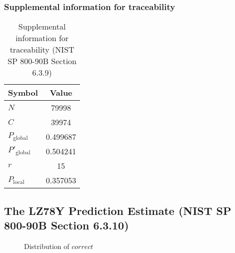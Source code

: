 \documentclass[a3paper,xelatex,english]{bxjsarticle}
\begin{document}
\subsubsection{Supplemental information for traceability}
\renewcommand{\arraystretch}{1.8}
\begin{table}[h]
\caption{Supplemental information for traceability (NIST SP 800-90B Section 6.3.9)}
\begin{center}
\begin{tabular}{|l|c|}
\hline 
\rowcolor{anotherlightblue} %
Symbol				& Value \\ \hline 
$N$				& 79998\\ \hline 
$C$				& 39974\\ \hline 
$P_{\textrm{global}}$				& 0.499687\\ \hline 
$P'_{\textrm{global}}$			& 0.504241\\ \hline 
$r$				& 15\\ \hline 
$P_{\textrm{local}}$ 			& 0.357053\\ \hline
\end{tabular}
\end{center}
\end{table}
\renewcommand{\arraystretch}{1.4}
\clearpage
\subsection{The LZ78Y Prediction Estimate (NIST SP 800-90B Section 6.3.10)}
\begin{figure}[htbp]
\caption{Distribution of $correct$}
\end{figure}
\end{document}
